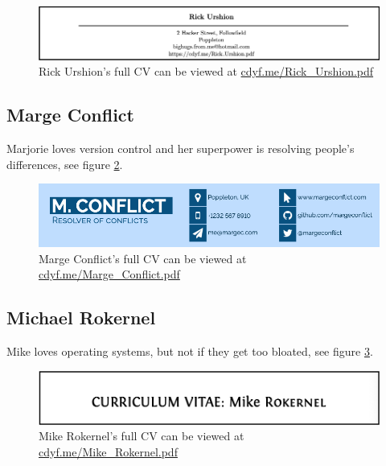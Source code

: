 \documentclass[
]{book}
\begin{document}
\begin{figure}

{\centering \includegraphics[width=1\linewidth]{images/rick_urshion} 

}

\caption{Rick Urshion's full CV can be viewed at \href{https://www.cdyf.me/Rick_Urshion.pdf}{cdyf.me/Rick\_Urshion.pdf}}\label{fig:rickurshion-fig}
\end{figure}



\hypertarget{marge-conflict}{%
\subsection{Marge Conflict}\label{marge-conflict}}

Marjorie loves version control and her superpower is resolving people's differences, see figure \ref{fig:margeconflict-fig}.

\begin{figure}

{\centering \includegraphics[width=1\linewidth]{images/marge_conflict} 

}

\caption{Marge Conflict's full CV can be viewed at \href{https://www.cdyf.me/Marge_Conflict.pdf}{cdyf.me/Marge\_Conflict.pdf}}\label{fig:margeconflict-fig}
\end{figure}



\hypertarget{mike-rokernel}{%
\subsection{Michael Rokernel}\label{mike-rokernel}}

Mike loves operating systems, but not if they get too bloated, see figure \ref{fig:mikrokernel-fig}.

\begin{figure}

{\centering \includegraphics[width=1\linewidth]{images/mike_rokernel} 

}

\caption{Mike Rokernel's full CV can be viewed at \href{https://www.cdyf.me/Mike_Rokernel.pdf}{cdyf.me/Mike\_Rokernel.pdf}}\label{fig:mikrokernel-fig}
\end{figure}
\end{document}
